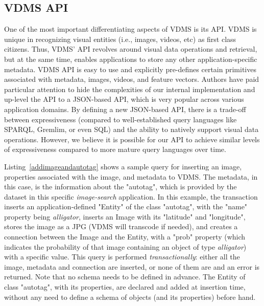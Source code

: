 \subsection{VDMS API}

One of the most important differentiating aspects of VDMS is its API.
VDMS is unique in recognizing visual entities (i.e., images, videos, etc)
as first class citizens.
Thus, VDMS' API revolves around visual data operations and retrieval,
but at the same time, enables applications to store any other
application-specific metadata.
VDMS API is easy to use and explicitly pre-defines certain
primitives associated with metadata, images, videos, and feature vectors.
Authors have paid particular attention to hide the complexities of our internal
implementation and up-level the API to a JSON-based API,
which is very popular across various application domains.
By defining a new JSON-based API, there is a trade-off between expressiveness
(compared to well-established query languages like SPARQL, Gremlim, or even SQL)
and the ability to natively support visual data operations.
However, we believe it is possible for our API to achieve similar levels of
expressiveness compared to more mature query languages over time.

Listing~\ref{addimageandautotag} shows a sample query for inserting
an image, properties associated with the image, and metadata to VDMS.
The metadata, in this case, is the information about the "autotag",
which is provided by the dataset in this specific
\textit{image-search} application.
In this example, the transaction inserts an application-defined "Entity" of
the class "autotag", with the "name" property being \textit{alligator},
inserts an Image with its "latitude" and "longitude",
stores the image as a JPG (VDMS will transcode if needed),
and creates a connection between the Image and the Entity, with a "prob"
property (which indicates the probability of that image
containing an object of type  \textit{alligator}) with a specific value.
This query is performed \textit{transactionally}: either all the image, metadata
and connection are inserted, or none of them are and an error is returned.
Note that no schema needs to be defined in advance.
The Entity of class "autotag", with its properties, are declared and added
at insertion time, without any need to define a schema of objects
(and its properties) before hand.

